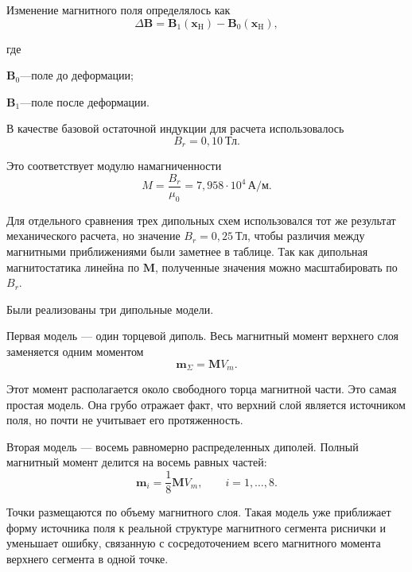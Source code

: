 \documentclass[14pt,a4paper]{extarticle}
\newif\ifwherefirst
\newcommand{\whereitem}[2]{%
    \ifwherefirst
        \wherefirstfalse
        #1\hspace{0.25em}---\hspace{0.25em}#2\par
    \else
        \noindent\hspace*{\parindent}\hphantom{где\enspace}#1\hspace{0.25em}---\hspace{0.25em}#2\par
    \fi
}
\newenvironment{whereblock}{%
    \vspace*{-1.55\baselineskip}%
    \begingroup
    \singlespacing
    \wherefirsttrue
    \par\indent где\enspace\ignorespaces
}{%
    \par\endgroup
    \par\vspace{\baselineskip}
}
\begin{document}
Изменение магнитного поля определялось как
\begin{equation}
    \Delta\mathbf{B}
    =
    \mathbf{B}_{1}(\mathbf{x}_{\mathrm{H}})
    -
    \mathbf{B}_{0}(\mathbf{x}_{\mathrm{H}}),
\end{equation}
\begin{whereblock}
\whereitem{\(\mathbf{B}_{0}\)}{поле до деформации;}
\whereitem{\(\mathbf{B}_{1}\)}{поле после деформации.}
\end{whereblock}

В качестве базовой остаточной индукции для расчета использовалось
\begin{equation}
    B_r=0,10~\text{Тл}.
\end{equation}

Это соответствует модулю намагниченности
\begin{equation}
    M=\frac{B_r}{\mu_0}
    =
    7,958\cdot10^{4}\,\text{А}/\text{м}.
\end{equation}

Для отдельного сравнения трех дипольных схем использовался тот же результат механического расчета, но значение \(B_r=0,25~\text{Тл}\), чтобы различия между магнитными приближениями были заметнее в таблице. Так как дипольная магнитостатика линейна по \(\mathbf{M}\), полученные значения можно масштабировать по \(B_r\).

Были реализованы три дипольные модели.

Первая модель --- один торцевой диполь. Весь магнитный момент верхнего слоя заменяется одним моментом
\begin{equation}
    \mathbf{m}_{\Sigma}
    =
    \mathbf{M}V_m.
\end{equation}

Этот момент располагается около свободного торца магнитной части. Это самая простая модель. Она грубо отражает факт, что верхний слой является источником поля, но почти не учитывает его протяженность.

Вторая модель --- восемь равномерно распределенных диполей. Полный магнитный момент делится на восемь равных частей:
\begin{equation}
    \mathbf{m}_i
    =
    \frac{1}{8}\mathbf{M}V_m,
    \qquad
    i=1,\ldots,8.
\end{equation}

Точки размещаются по объему магнитного слоя. Такая модель уже приближает форму источника поля к реальной структуре магнитного сегмента риснички и уменьшает ошибку, связанную с сосредоточением всего магнитного момента верхнего сегмента в одной точке.
\end{document}
